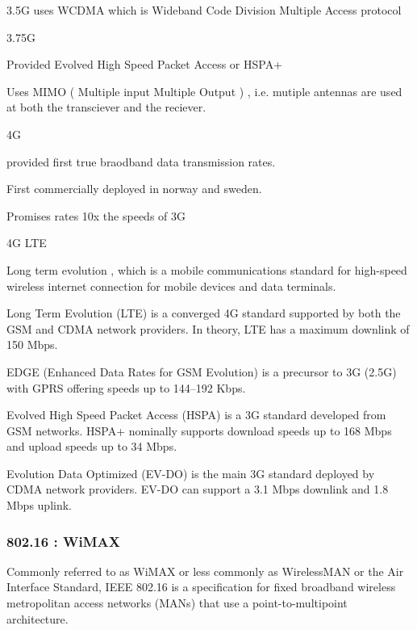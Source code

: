 3.5G uses WCDMA which is Wideband Code Division Multiple Access protocol

3.75G

Provided Evolved High Speed Packet Access or HSPA+

Uses MIMO ( Multiple input Multiple Output ) , i.e. mutiple antennas are used at
both the transciever and the reciever.

4G

provided first true braodband data transmission rates.

First commercially deployed in norway and sweden.

Promises rates 10x the speeds of 3G


4G LTE

Long term evolution , which is a mobile communications standard for high-speed
wireless internet connection for mobile devices and data terminals.

Long Term Evolution (LTE) is a converged 4G standard supported by both the GSM and CDMA network providers. In theory, LTE has a maximum downlink of 150 Mbps.

 

EDGE (Enhanced Data Rates for GSM Evolution) is a precursor to 3G (2.5G) with GPRS offering speeds up to 144–192 Kbps.

 

Evolved High Speed Packet Access (HSPA) is a 3G standard developed from GSM networks. HSPA+ nominally supports download speeds up to 168 Mbps and upload speeds up to 34 Mbps.

 

Evolution Data Optimized (EV-DO) is the main 3G standard deployed by CDMA network providers. EV-DO can support a 3.1 Mbps downlink and 1.8 Mbps uplink.


\subsubsectionend

\subsubsection{802.16 : WiMAX}
\label{sssec:802_16_wimax}

Commonly referred to as WiMAX or less commonly as WirelessMAN
or the Air Interface Standard, IEEE 802.16 is a specification for fixed
broadband wireless metropolitan access networks (MANs) that use a
point-to-multipoint architecture. 

\subsubsectionend



